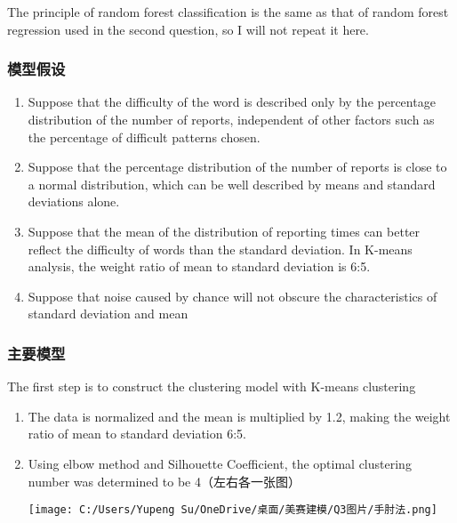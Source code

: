 \documentclass[
]{article}
\begin{document}
The principle of random forest classification is the same as that of
random forest regression used in the second question, so I will not
repeat it here.

\hypertarget{ux6a21ux578bux5047ux8bbe}{%
\subsubsection{模型假设}\label{ux6a21ux578bux5047ux8bbe}}

\begin{enumerate}
\def\labelenumi{\arabic{enumi}.}
\item
  Suppose that the difficulty of the word is described only by the
  percentage distribution of the number of reports, independent of other
  factors such as the percentage of difficult patterns chosen.
\item
  Suppose that the percentage distribution of the number of reports is
  close to a normal distribution, which can be well described by means
  and standard deviations alone.
\item
  Suppose that the mean of the distribution of reporting times can
  better reflect the difficulty of words than the standard deviation. In
  K-means analysis, the weight ratio of mean to standard deviation is
  6:5.
\item
  Suppose that noise caused by chance will not obscure the
  characteristics of standard deviation and mean
\end{enumerate}

\hypertarget{ux4e3bux8981ux6a21ux578b}{%
\subsubsection{主要模型}\label{ux4e3bux8981ux6a21ux578b}}

The first step is to construct the clustering model with K-means
clustering

\begin{enumerate}
\def\labelenumi{\arabic{enumi}.}
\item
  The data is normalized and the mean is multiplied by 1.2, making the
  weight ratio of mean to standard deviation 6:5.
\item
  Using elbow method and Silhouette Coefficient, the optimal clustering
  number was determined to be 4（左右各一张图）

  \texttt{[image: C:/Users/Yupeng Su/OneDrive/桌面/美赛建模/Q3图片/手肘法.png]}
\end{enumerate}
\end{document}
